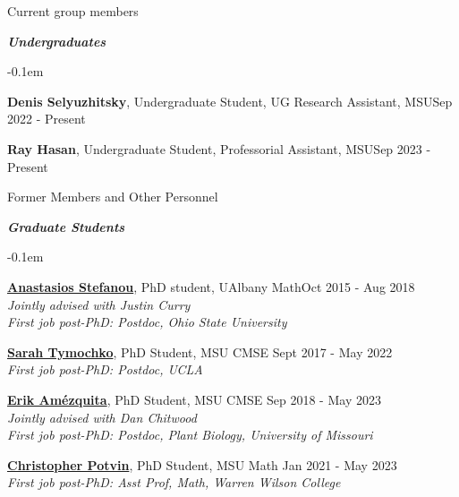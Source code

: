 \documentclass{resume} %
\begin{document}
\begin{rSection}{Current group members}
\begin{list}{}{\leftmargin=1em}
\end{list}

\textbf{\textit{Undergraduates}}
\begin{list}{}{\leftmargin=1em}
   \itemsep -0.1em %
   \item \textbf{Denis Selyuzhitsky}, Undergraduate Student, UG Research Assistant, MSU\hfill Sep 2022 - Present
   \item \textbf{Ray Hasan}, Undergraduate Student, Professorial Assistant, MSU\hfill Sep 2023 - Present
\end{list}

\end{rSection}
\begin{rSection}{Former Members and Other Personnel}


\textbf{\textit{Graduate Students}}
\begin{list}{}{\leftmargin=1em}
   \itemsep -0.1em %


   \item \textbf{\href{https://sites.google.com/view/anastasiostefanou/home}{Anastasios Stefanou}}, PhD student, UAlbany Math\hfill Oct 2015 - Aug 2018
\\
   \phantom{XXX} \textit{Jointly advised with Justin Curry}
\\
   \phantom{XXX} \textit{First job post-PhD: Postdoc, Ohio State University}


   \item \textbf{\href{https://www.sarahtymochko.com/}{Sarah Tymochko}}, PhD Student, MSU CMSE \hfill Sept 2017 - May 2022
\\
   \phantom{XXX} \textit{First job post-PhD: Postdoc, UCLA}

   \item \textbf{\href{https://ejamezquita.github.io/}{Erik Am\'ezquita}}, PhD Student, MSU CMSE \hfill Sep 2018 - May 2023
\\
   \phantom{XXX} \textit{Jointly advised with Dan Chitwood}\\
   \phantom{XXX} \textit{First job post-PhD: Postdoc, Plant Biology, University of Missouri}

   \item \textbf{\href{https://sites.google.com/view/christopherpotvin/home}{Christopher Potvin}}, PhD Student, MSU Math \hfill Jan 2021 - May 2023\\
   \phantom{XXX} \textit{First job post-PhD: Asst Prof, Math, Warren Wilson College}



\end{list}
\end{rSection}
\end{document}
